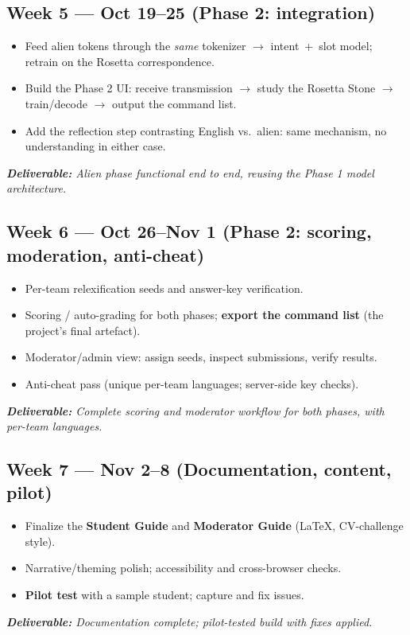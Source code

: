 \documentclass[a4]{article}
\newcommand{\deliv}[1]{\textit{\textbf{Deliverable:} #1}}
\begin{document}
\subsection*{Week 5 --- Oct 19--25 \quad (Phase 2: integration)}
\begin{itemize}[leftmargin=*, itemsep=1pt]
    \item Feed alien tokens through the \emph{same} tokenizer $\rightarrow$
    intent~+~slot model; retrain on the Rosetta correspondence.
    \item Build the Phase 2 UI: receive transmission $\rightarrow$ study the Rosetta
    Stone $\rightarrow$ train/decode $\rightarrow$ output the command list.
    \item Add the reflection step contrasting English vs.\ alien: same mechanism,
    no understanding in either case.
\end{itemize}
\deliv{Alien phase functional end to end, reusing the Phase 1 model architecture.}

\subsection*{Week 6 --- Oct 26--Nov 1 \quad (Phase 2: scoring, moderation, anti-cheat)}
\begin{itemize}[leftmargin=*, itemsep=1pt]
    \item Per-team relexification seeds and answer-key verification.
    \item Scoring / auto-grading for both phases; \textbf{export the command list}
    (the project's final artefact).
    \item Moderator/admin view: assign seeds, inspect submissions, verify results.
    \item Anti-cheat pass (unique per-team languages; server-side key checks).
\end{itemize}
\deliv{Complete scoring and moderator workflow for both phases, with per-team languages.}

\subsection*{Week 7 --- Nov 2--8 \quad (Documentation, content, pilot)}
\begin{itemize}[leftmargin=*, itemsep=1pt]
    \item Finalize the \textbf{Student Guide} and \textbf{Moderator Guide} (LaTeX,
    CV-challenge style).
    \item Narrative/theming polish; accessibility and cross-browser checks.
    \item \textbf{Pilot test} with a sample student; capture and fix issues.
\end{itemize}
\deliv{Documentation complete; pilot-tested build with fixes applied.}
\end{document}
